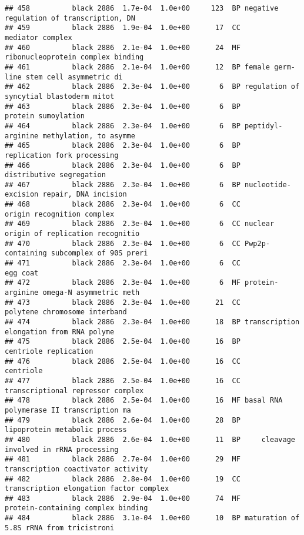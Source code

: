 \documentclass[]{article}
\begin{document}
\begin{verbatim}
## 458          black 2886  1.7e-04  1.0e+00     123  BP negative regulation of transcription, DN
## 459          black 2886  1.9e-04  1.0e+00      17  CC                         mediator complex
## 460          black 2886  2.1e-04  1.0e+00      24  MF        ribonucleoprotein complex binding
## 461          black 2886  2.1e-04  1.0e+00      12  BP female germ-line stem cell asymmetric di
## 462          black 2886  2.3e-04  1.0e+00       6  BP regulation of syncytial blastoderm mitot
## 463          black 2886  2.3e-04  1.0e+00       6  BP                      protein sumoylation
## 464          black 2886  2.3e-04  1.0e+00       6  BP peptidyl-arginine methylation, to asymme
## 465          black 2886  2.3e-04  1.0e+00       6  BP              replication fork processing
## 466          black 2886  2.3e-04  1.0e+00       6  BP                 distributive segregation
## 467          black 2886  2.3e-04  1.0e+00       6  BP nucleotide-excision repair, DNA incision
## 468          black 2886  2.3e-04  1.0e+00       6  CC               origin recognition complex
## 469          black 2886  2.3e-04  1.0e+00       6  CC nuclear origin of replication recognitio
## 470          black 2886  2.3e-04  1.0e+00       6  CC Pwp2p-containing subcomplex of 90S preri
## 471          black 2886  2.3e-04  1.0e+00       6  CC                                 egg coat
## 472          black 2886  2.3e-04  1.0e+00       6  MF protein-arginine omega-N asymmetric meth
## 473          black 2886  2.3e-04  1.0e+00      21  CC            polytene chromosome interband
## 474          black 2886  2.3e-04  1.0e+00      18  BP transcription elongation from RNA polyme
## 475          black 2886  2.5e-04  1.0e+00      16  BP                    centriole replication
## 476          black 2886  2.5e-04  1.0e+00      16  CC                                centriole
## 477          black 2886  2.5e-04  1.0e+00      16  CC        transcriptional repressor complex
## 478          black 2886  2.5e-04  1.0e+00      16  MF basal RNA polymerase II transcription ma
## 479          black 2886  2.6e-04  1.0e+00      28  BP            lipoprotein metabolic process
## 480          black 2886  2.6e-04  1.0e+00      11  BP     cleavage involved in rRNA processing
## 481          black 2886  2.7e-04  1.0e+00      29  MF       transcription coactivator activity
## 482          black 2886  2.8e-04  1.0e+00      19  CC  transcription elongation factor complex
## 483          black 2886  2.9e-04  1.0e+00      74  MF       protein-containing complex binding
## 484          black 2886  3.1e-04  1.0e+00      10  BP maturation of 5.8S rRNA from tricistroni

\end{verbatim}
\end{document}
